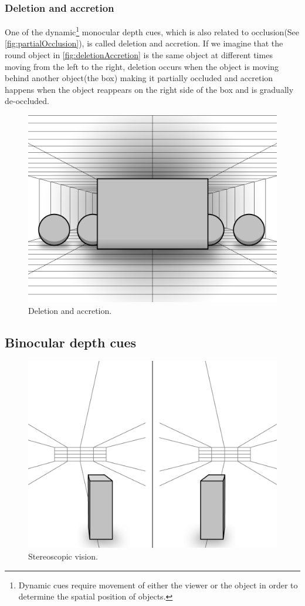 \subsubsection{Deletion and accretion}
One of the dynamic\footnote{Dynamic cues require movement of either the viewer or the object in order to determine the spatial position of objects\citep{sensationPerception}.} monocular depth cues, which is also related to occlusion(See \autoref{fig:partialOcclusion}), is called deletion and accretion. If we imagine that the round object in \autoref{fig:deletionAccretion} is the same object at different times moving from the left to the right, deletion occurs when the object is moving behind another object(the box) making it partially occluded and accretion happens when the object reappears on the right side of the box and is gradually de-occluded\citep{sensationPerception}.
\begin{figure}[H]
	\centering
	\includegraphics[width=0.8\linewidth]{figure/Analysis/deletionAccretion.png}
	\caption{Deletion and accretion.}
	\label{fig:deletionAccretion}
\end{figure}

\subsection{Binocular depth cues}
\begin{figure}[H]
	\centering
	\includegraphics[width=1\linewidth]{figure/Analysis/stereoScopicVision.png}
	\caption{Stereoscopic vision.}
	\label{fig:stereoscopicVision}
\end{figure}


